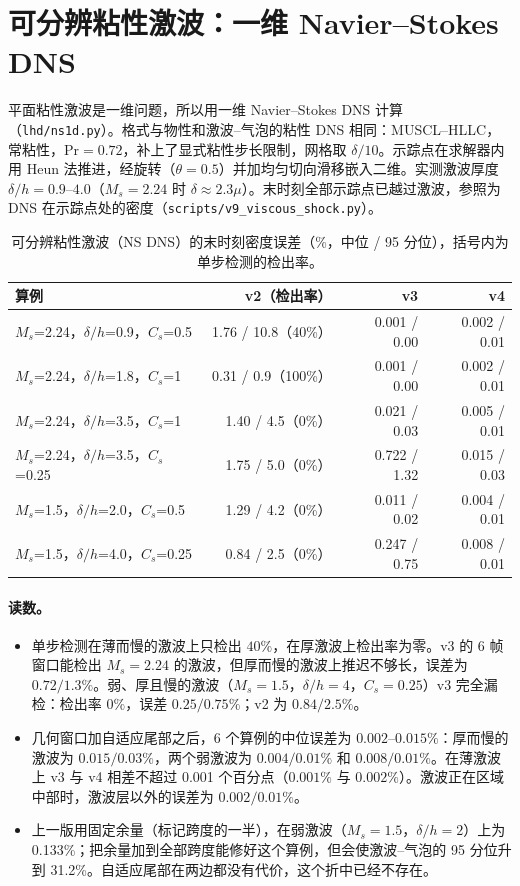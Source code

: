 \section{可分辨粘性激波：一维 Navier–Stokes DNS}
平面粘性激波是一维问题，所以用一维 Navier–Stokes DNS 计算（\texttt{lhd/ns1d.py}）。格式与物性和激波–气泡的粘性 DNS 相同：MUSCL–HLLC，常粘性，$\mathrm{Pr}=0.72$，补上了显式粘性步长限制，网格取 $\delta/10$。示踪点在求解器内用 Heun 法推进，经旋转（$\theta=0.5$）并加均匀切向滑移嵌入二维。实测激波厚度 $\delta/h=0.9\mbox{--}4.0$（$M_s=2.24$ 时 $\delta\approx2.3\mu$）。末时刻全部示踪点已越过激波，参照为 DNS 在示踪点处的密度（\texttt{scripts/v9\_viscous\_shock.py}）。
\begin{table}[!htbp]\centering\small\caption{可分辨粘性激波（NS DNS）的末时刻密度误差（\%，中位 / 95 分位），括号内为单步检测的检出率。}
\begin{tabularx}{\linewidth}{@{}L r r r@{}}\toprule
算例 & v2（检出率） & v3 & v4\\\midrule
$M_s$=2.24，$\delta/h$=0.9，$C_s$=0.5 & 1.76 / 10.8（40\%） & 0.001 / 0.00 & 0.002 / 0.01\\
$M_s$=2.24，$\delta/h$=1.8，$C_s$=1 & 0.31 / 0.9（100\%） & 0.001 / 0.00 & 0.002 / 0.01\\
$M_s$=2.24，$\delta/h$=3.5，$C_s$=1 & 1.40 / 4.5（0\%） & 0.021 / 0.03 & 0.005 / 0.01\\
$M_s$=2.24，$\delta/h$=3.5，$C_s$=0.25 & 1.75 / 5.0（0\%） & 0.722 / 1.32 & 0.015 / 0.03\\
$M_s$=1.5，$\delta/h$=2.0，$C_s$=0.5 & 1.29 / 4.2（0\%） & 0.011 / 0.02 & 0.004 / 0.01\\
$M_s$=1.5，$\delta/h$=4.0，$C_s$=0.25 & 0.84 / 2.5（0\%） & 0.247 / 0.75 & 0.008 / 0.01\\
\bottomrule\end{tabularx}\end{table}
\paragraph{读数。}
\begin{itemize}
\item 单步检测在薄而慢的激波上只检出 $40\%$，在厚激波上检出率为零。v3 的 6 帧窗口能检出 $M_s=2.24$ 的激波，但厚而慢的激波上推迟不够长，误差为 $0.72 / 1.3\%$。弱、厚且慢的激波（$M_s=1.5$，$\delta/h=4$，$C_s=0.25$）v3 完全漏检：检出率 $0\%$，误差 $0.25 / 0.75\%$；v2 为 $0.84 / 2.5\%$。
\item 几何窗口加自适应尾部之后，6 个算例的中位误差为 $0.002\mbox{--}0.015\%$：厚而慢的激波为 $0.015 / 0.03\%$，两个弱激波为 $0.004 / 0.01\%$ 和 $0.008 / 0.01\%$。在薄激波上 v3 与 v4 相差不超过 0.001 个百分点（$0.001\%$ 与 $0.002\%$）。激波正在区域中部时，激波层以外的误差为 $0.002 / 0.01\%$。
\item 上一版用固定余量（标记跨度的一半），在弱激波（$M_s=1.5$，$\delta/h=2$）上为 0.133\%；把余量加到全部跨度能修好这个算例，但会使激波–气泡的 95 分位升到 31.2\%。自适应尾部在两边都没有代价，这个折中已经不存在。
\end{itemize}

